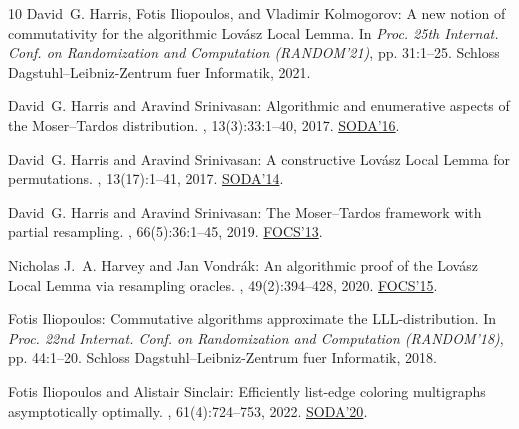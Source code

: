 \documentclass[11pt]{article}
\begin{document}
\begin{thebibliography}{10}
{\sc David~G. Harris, Fotis Iliopoulos, and Vladimir Kolmogorov}: A new notion
  of commutativity for the algorithmic {Lov{\'a}sz {L}ocal {L}emma}.
\newblock In {\em Proc. 25th Internat. Conf. on Randomization and Computation
  (RANDOM'21)}, pp. 31:1--25. Schloss Dagstuhl--Leibniz-Zentrum fuer
  Informatik, 2021.

{\sc David~G. Harris and Aravind Srinivasan}: Algorithmic and enumerative
  aspects of the {M}oser--{T}ardos distribution.
, 13(3):33:1--40, 2017.
\newblock \prelim
  \href{https://doi.org/10.1137/1.9781611974331.ch140}{SODA'16}.
\newblock [\epfmtdoi{10.1145/3039869}]

{\sc David~G. Harris and Aravind Srinivasan}: A constructive {L}ov{\'a}sz
  {L}ocal {L}emma for permutations.
, 13(17):1--41, 2017.
\newblock \prelim \href{https://doi.org/10.1137/1.9781611973402.68}{SODA'14}.

{\sc David~G. Harris and Aravind Srinivasan}: The {M}oser--{T}ardos framework
  with partial resampling.
, 66(5):36:1--45, 2019.
\newblock \prelim \href{https://doi.org/10.1109/FOCS.2013.57}{FOCS'13}.
\newblock [\epfmtdoi{10.1145/3342222}]

{\sc Nicholas J.~A. Harvey and Jan Vondr{\'{a}}k}: An algorithmic proof of the
  {L}ov\'{a}sz {L}ocal {L}emma via resampling oracles.
, 49(2):394--428, 2020.
\newblock \prelim \href{https://doi.org/10.1109/FOCS.2015.85}{FOCS'15}.
\newblock [\epfmtdoi{10.1137/18M1167176}]

{\sc Fotis Iliopoulos}: Commutative algorithms approximate the
  {LLL}-distribution.
\newblock In {\em Proc. 22nd Internat. Conf. on Randomization and Computation
  (RANDOM'18)}, pp. 44:1--20. Schloss Dagstuhl--Leibniz-Zentrum fuer
  Informatik, 2018.

{\sc Fotis Iliopoulos and Alistair Sinclair}: Efficiently list-edge coloring
  multigraphs asymptotically optimally.
, 61(4):724--753, 2022.
\newblock \prelim \href{https://doi.org/10.1137/1.9781611975994.142}{SODA'20}.


\end{thebibliography}
\end{document}
